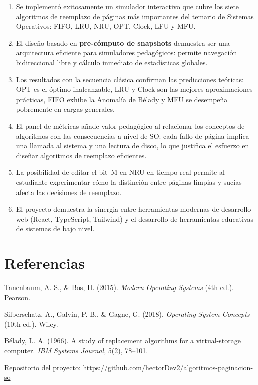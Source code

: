 \documentclass[12pt, a4paper]{article}
\begin{document}
\begin{enumerate}
  \item Se implementó exitosamente un simulador interactivo que cubre los siete algoritmos de reemplazo de páginas más importantes del temario de Sistemas Operativos: FIFO, LRU, NRU, OPT, Clock, LFU y MFU.

  \item El diseño basado en \textbf{pre-cómputo de snapshots} demuestra ser una arquitectura eficiente para simuladores pedagógicos: permite navegación bidireccional libre y cálculo inmediato de estadísticas globales.

  \item Los resultados con la secuencia clásica confirman las predicciones teóricas: OPT es el óptimo inalcanzable, LRU y Clock son las mejores aproximaciones prácticas, FIFO exhibe la Anomalía de Bélady y MFU se desempeña pobremente en cargas generales.

  \item El panel de métricas añade valor pedagógico al relacionar los conceptos de algoritmos con las consecuencias a nivel de SO: cada fallo de página implica una llamada al sistema y una lectura de disco, lo que justifica el esfuerzo en diseñar algoritmos de reemplazo eficientes.

  \item La posibilidad de editar el bit~M en NRU en tiempo real permite al estudiante experimentar cómo la distinción entre páginas limpias y sucias afecta las decisiones de reemplazo.

  \item El proyecto demuestra la sinergia entre herramientas modernas de desarrollo web (React, TypeScript, Tailwind) y el desarrollo de herramientas educativas de sistemas de bajo nivel.
\end{enumerate}

\section*{Referencias}

\begin{enumerate}[label={[\arabic*]}]
  \item Tanenbaum, A. S., \& Bos, H. (2015). \textit{Modern Operating Systems} (4th ed.). Pearson.
  \item Silberschatz, A., Galvin, P. B., \& Gagne, G. (2018). \textit{Operating System Concepts} (10th ed.). Wiley.
  \item Bélady, L. A. (1966). A study of replacement algorithms for a virtual-storage computer. \textit{IBM Systems Journal}, 5(2), 78--101.
  \item Repositorio del proyecto: \url{https://github.com/hectorDev2/algoritmos-paginacion-so}
\end{enumerate}
\end{document}
